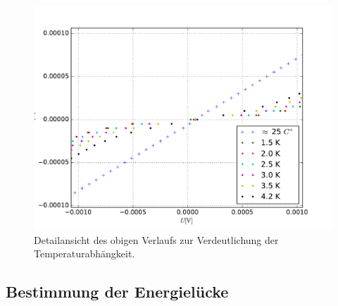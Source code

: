\documentclass[twoside,        %
               BCOR12mm,       %
               english,ngerman, %
               fleqn,headsepline=false,footsepline=false
              ]{MFPREPORT}
\begin{document}
\begin{figure}
\centering
\includegraphics[scale=0.6]{2B.pdf}
\caption{Detailansicht des obigen Verlaufs zur Verdeutlichung der Temperaturabhängkeit.}
\label{fig:SLNLB}
\end{figure}

\subsection{Bestimmung der Energielücke}
\end{document}
